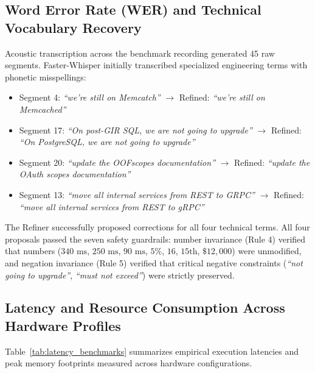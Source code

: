 \documentclass[10pt,a4paper]{article}
\begin{document}
\subsection{Word Error Rate (WER) and Technical Vocabulary Recovery}
Acoustic transcription across the benchmark recording generated 45 raw segments. Faster-Whisper initially transcribed specialized engineering terms with phonetic misspellings:
\begin{itemize}
    \item Segment 4: \textit{``we're still on Memcatch''} $\longrightarrow$ Refined: \textit{``we're still on Memcached''}
    \item Segment 17: \textit{``On post-GIR SQL, we are not going to upgrade''} $\longrightarrow$ Refined: \textit{``On PostgreSQL, we are not going to upgrade''}
    \item Segment 20: \textit{``update the OOFscopes documentation''} $\longrightarrow$ Refined: \textit{``update the OAuth scopes documentation''}
    \item Segment 13: \textit{``move all internal services from REST to GRPC''} $\longrightarrow$ Refined: \textit{``move all internal services from REST to gRPC''}
\end{itemize}
The Refiner successfully proposed corrections for all four technical terms. All four proposals passed the seven safety guardrails: number invariance (Rule 4) verified that numbers ($340\text{ ms}$, $250\text{ ms}$, $90\text{ ms}$, $5\%$, $16$, $15\text{th}$, $\$12,000$) were unmodified, and negation invariance (Rule 5) verified that critical negative constraints (\textit{``not going to upgrade''}, \textit{``must not exceed''}) were strictly preserved.

\subsection{Latency and Resource Consumption Across Hardware Profiles}
Table~\ref{tab:latency_benchmarks} summarizes empirical execution latencies and peak memory footprints measured across hardware configurations.
\end{document}
